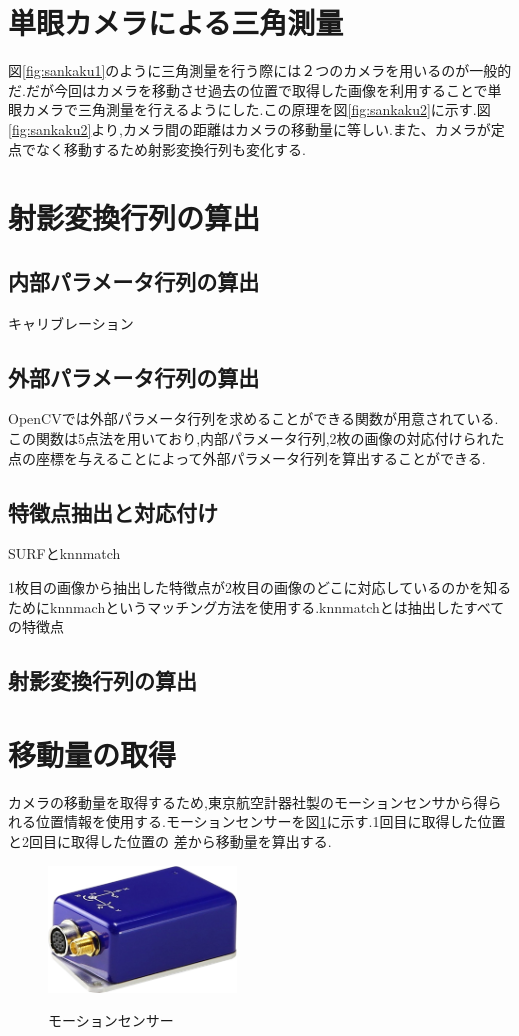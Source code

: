 \documentclass[12pt,oneside]{sotsuken_paper}
\begin{document}
\section{単眼カメラによる三角測量}
図\ref{fig:sankaku1}のように三角測量を行う際には２つのカメラを用いるのが一般的だ.だが今回はカメラを移動させ過去の位置で取得した画像を利用することで単眼カメラで三角測量を行えるようにした.この原理を図\ref{fig:sankaku2}に示す.図\ref{fig:sankaku2}より,カメラ間の距離はカメラの移動量に等しい.また、カメラが定点でなく移動するため射影変換行列も変化する.
\section{射影変換行列の算出}
\subsection{内部パラメータ行列の算出}
キャリブレーション
\subsection{外部パラメータ行列の算出}
OpenCVでは外部パラメータ行列を求めることができる関数が用意されている.この関数は5点法\cite{fivepoint}を用いており,内部パラメータ行列,2枚の画像の対応付けられた点の座標を与えることによって外部パラメータ行列を算出することができる.

\subsection{特徴点抽出と対応付け}
SURFとknnmatch

1枚目の画像から抽出した特徴点が2枚目の画像のどこに対応しているのかを知るためにknnmachというマッチング方法を使用する.knnmatchとは抽出したすべての特徴点

\subsection{射影変換行列の算出}
\section{移動量の取得}
カメラの移動量を取得するため,東京航空計器社製のモーションセンサから得られる位置情報を使用する.モーションセンサーを図\ref{fig:motion}に示す.1回目に取得した位置と2回目に取得した位置の
差から移動量を算出する.

\begin{figure}[htp]
 \begin{center}
  \includegraphics[width=50mm]{img/soft/motion.jpg}
 　\caption{モーションセンサー}
  \label{fig:motion}%
 \end{center}
\end{figure}
\end{document}
